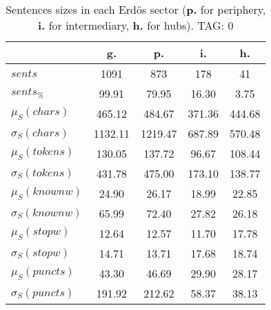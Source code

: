 \begin{table}[h!]
\begin{center}
\begin{tabular}{| l | c | c | c | c |}\hline
 & g. & p. & i. & h. \\\hline
$sents$ & 1091  & 873  & 178  & 41 \\\hline
$sents_{\%}$ & 99.91  & 79.95  & 16.30  & 3.75 \\\hline
$\mu_S(chars)$ & 465.12  & 484.67  & 371.36  & 444.68 \\\hline
$\sigma_S(chars)$ & 1132.11  & 1219.47  & 687.89  & 570.48 \\\hline
$\mu_S(tokens)$ & 130.05  & 137.72  & 96.67  & 108.44 \\\hline
$\sigma_S(tokens)$ & 431.78  & 475.00  & 173.10  & 138.77 \\\hline
$\mu_S(knownw)$ & 24.90  & 26.17  & 18.99  & 22.85 \\\hline
$\sigma_S(knownw)$ & 65.99  & 72.40  & 27.82  & 26.18 \\\hline
$\mu_S(stopw)$ & 12.64  & 12.57  & 11.70  & 17.78 \\\hline
$\sigma_S(stopw)$ & 14.71  & 13.71  & 17.68  & 18.74 \\\hline
$\mu_S(puncts)$ & 43.30  & 46.69  & 29.90  & 28.17 \\\hline
$\sigma_S(puncts)$ & 191.92  & 212.62  & 58.37  & 38.13 \\\hline
\end{tabular}
\caption{Sentences sizes in each Erd\"os sector ({{\bf p.}} for periphery, {{\bf i.}} for intermediary, {{\bf h.}} for hubs). TAG: 0}
\end{center}
\end{table}